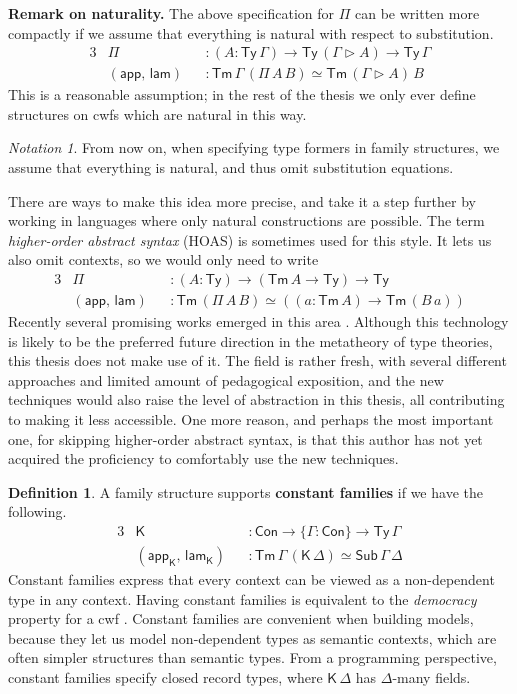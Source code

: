 \documentclass[12pt,a4paper,twoside,openany]{book}
\theoremstyle{remark}
\newtheorem{notation}{Notation}
\theoremstyle{definition}
\newtheorem{mydefinition}{Definition}
\newcommand{\ms}[1]{\mathsf{#1}}
\newcommand{\Con}{\mathsf{Con}}
\newcommand{\Sub}{\mathsf{Sub}}
\newcommand{\Tm}{\mathsf{Tm}}
\newcommand{\Ty}{\mathsf{Ty}}
\newcommand{\ext}{\triangleright}
\newcommand{\lamK}{\mathsf{lam}_{\K}}
\newcommand{\appK}{\mathsf{app}_{\K}}
\newcommand{\K}{\mathsf{K}}
\newcommand{\app}{\ms{app}}
\newcommand{\lam}{\ms{lam}}
\begin{document}
\textbf{Remark on naturality.} The above specification for $\Pi$ can be written
more compactly if we assume that everything is natural with respect to
substitution.
\begin{alignat*}{3}
  &\Pi            &&: (A : \Ty\,\Gamma) \to \Ty\,(\Gamma\ext A) \to \Ty\,\Gamma\\
  & (\app,\,\lam) &&: \Tm\,\Gamma\,(\Pi\,A\,B) \simeq \Tm\,(\Gamma \ext A)\,B
\end{alignat*}
This is a reasonable assumption; in the rest of the thesis we only ever define
structures on cwfs which are natural in this way.

\begin{notation} From now on, when specifying type formers in family structures,
we assume that everything is natural, and thus omit substitution equations.
\end{notation}

There are ways to make this idea more precise, and take it a step further by
working in languages where only natural constructions are possible. The term
\emph{higher-order abstract syntax} (HOAS) is sometimes used for this style. It lets us
also omit contexts, so we would only need to write
\begin{alignat*}{3}
  &\Pi            &&: (A : \Ty) \to (\Tm\,A \to \Ty) \to \Ty\\
  & (\app,\,\lam) &&: \Tm\,(\Pi\,A\,B) \simeq ((a : \Tm\,A) \to \Tm\,(B\,a))
\end{alignat*}
Recently several promising works emerged in this area \cite{TODO}. Although this
technology is likely to be the preferred future direction in the metatheory of
type theories, this thesis does not make use of it. The field is rather fresh,
with several different approaches and limited amount of pedagogical exposition,
and the new techniques would also raise the level of abstraction in this thesis,
all contributing to making it less accessible. One more reason, and perhaps the
most important one, for skipping higher-order abstract syntax, is that this
author has not yet acquired the proficiency to comfortably use the new
techniques.

\begin{mydefinition}
\label{def:constant-families}
A family structure supports \textbf{constant families} if we have the following.
\begin{alignat*}{3}
  & \K &&: \Con \to \{\Gamma : \Con \} \to \Ty\,\Gamma \\
  & (\appK,\,\lamK) &&: \Tm\,\Gamma\,(\K\,\Delta) \simeq \Sub\,\Gamma\,\Delta
\end{alignat*}
Constant families express that every context can be viewed as a non-dependent
type in any context. Having constant families is equivalent to the
\emph{democracy} property for a cwf
\cite{clairambault2014biequivalence,forsberg-phd}.  Constant families are
convenient when building models, because they let us model non-dependent types
as semantic contexts, which are often simpler structures than semantic types.
From a programming perspective, constant families specify closed record types,
where $\K\,\Delta$ has $\Delta$-many fields.
\end{mydefinition}
\end{document}
